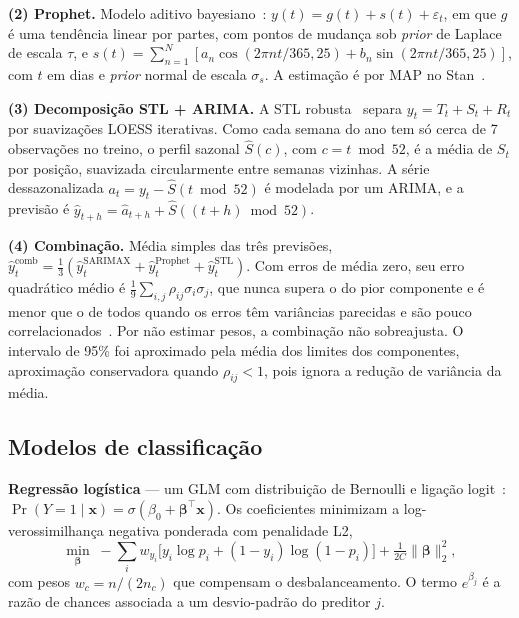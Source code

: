 \documentclass[conference,a4paper]{IEEEtran}
\begin{document}
\textbf{(2) Prophet.} Modelo aditivo bayesiano~\cite{taylor2018prophet}:
$y(t) = g(t) + s(t) + \varepsilon_t$, em que $g$ é uma tendência linear por partes, com pontos
de mudança sob \textit{prior} de Laplace de escala $\tau$, e
$s(t) = \sum_{n=1}^{N}[a_n\cos(2\pi n t/365{,}25) + b_n\sin(2\pi n t/365{,}25)]$, com $t$ em dias e
\textit{prior} normal de escala $\sigma_s$. A estimação é por MAP no Stan~\cite{carpenter2017stan}.

\textbf{(3) Decomposição STL + ARIMA.} A STL robusta~\cite{cleveland1990stl} separa
$y_t = T_t + S_t + R_t$ por suavizações LOESS iterativas. Como cada semana do ano tem só
cerca de 7 observações no treino, o perfil sazonal $\hat S(c)$, com $c = t \bmod 52$, é a média
de $S_t$ por posição, suavizada circularmente entre semanas vizinhas. A série dessazonalizada
$a_t = y_t - \hat S(t \bmod 52)$ é modelada por um ARIMA, e a previsão é
$\hat y_{t+h} = \hat a_{t+h} + \hat S((t+h)\bmod 52)$.

\textbf{(4) Combinação.} Média simples das três previsões,
$\hat y^{\mathrm{comb}}_t = \frac13(\hat y^{\mathrm{SARIMAX}}_t+\hat y^{\mathrm{Prophet}}_t+\hat y^{\mathrm{STL}}_t)$.
Com erros de média zero, seu erro quadrático médio é
$\frac{1}{9}\sum_{i,j}\rho_{ij}\sigma_i\sigma_j$, que nunca supera o do pior componente e é
menor que o de todos quando os erros têm variâncias parecidas e são pouco
correlacionados~\cite{bates1969combination}. Por não estimar pesos, a combinação não sobreajusta.
O intervalo de 95\% foi aproximado pela média dos limites dos componentes, aproximação
conservadora quando $\rho_{ij}<1$, pois ignora a redução de variância da média.

\subsection{Modelos de classificação}

\textbf{Regressão logística} --- um GLM com distribuição de Bernoulli e ligação
logit~\cite{nelder1972glm}: $\Pr(Y=1\mid\mathbf x) = \sigma(\beta_0+\bm\beta^\top\mathbf x)$.
Os coeficientes minimizam a log-verossimilhança negativa ponderada com penalidade L2,
\begin{equation}
\min_{\bm\beta}\; -\sum_i w_{y_i}\big[y_i\log p_i+(1-y_i)\log(1-p_i)\big] + \tfrac{1}{2C}\lVert\bm\beta\rVert_2^2,
\end{equation}
com pesos $w_c = n/(2n_c)$ que compensam o desbalanceamento. O termo $e^{\beta_j}$ é a razão
de chances associada a um desvio-padrão do preditor $j$.
\end{document}
